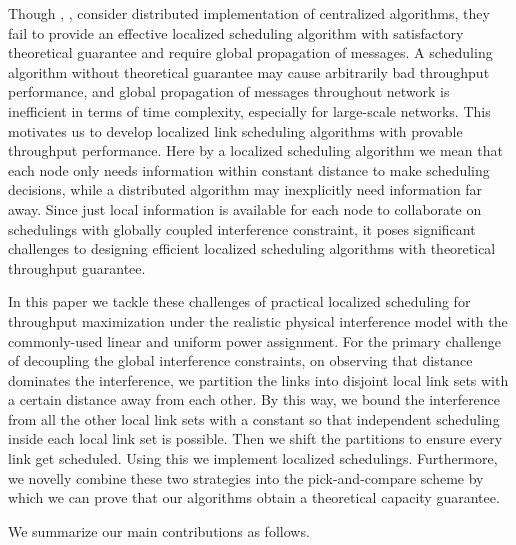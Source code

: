 \documentclass[journal]{IEEEtran}
\begin{document}
Though  \cite{S:phy17}, \cite{S:phy7}, \cite{brar-icdcs08} consider distributed implementation of centralized algorithms, they fail to provide an effective localized scheduling algorithm with satisfactory theoretical guarantee \cite{S:phy17}\cite{S:phy7} and require global propagation of messages.
A scheduling algorithm without theoretical guarantee may cause arbitrarily bad throughput performance, and  global propagation of messages throughout network is inefficient in terms of time complexity\cite{peleg87}, especially for  large-scale networks.
This motivates us to develop localized link scheduling algorithms with provable throughput performance. Here by a localized scheduling algorithm we mean  that each node only needs information within constant distance to make scheduling decisions, while a distributed algorithm may inexplicitly need information far away.  Since just local information is available for each node to collaborate on schedulings with globally coupled interference constraint, it poses significant challenges to designing  efficient localized scheduling algorithms with theoretical throughput guarantee.

\indent In this paper we tackle these challenges of practical localized scheduling for throughput maximization under the realistic physical interference model with the commonly-used linear and uniform power assignment. For the primary challenge of decoupling the global interference constraints, on observing that distance dominates the interference, we partition the links into disjoint local link sets with a certain distance away from each other. By this way, we bound the interference from  all the other local link sets with a constant so that independent scheduling inside each local link set is possible. Then we shift the partitions to ensure every link get scheduled.  Using this we  implement localized schedulings. Furthermore, we novelly combine these two strategies into the pick-and-compare scheme by which we can prove that our algorithms obtain a theoretical capacity guarantee.

 We summarize our main contributions as follows.
\end{document}
